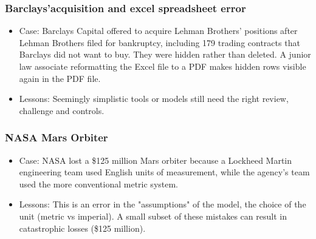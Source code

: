 \subsubsection{Barclays'acquisition and excel spreadsheet error}
\begin{itemize}
\item Case: Barclays Capital offered to acquire Lehman Brothers' positions after Lehman Brothers filed for bankruptcy, including 179 trading contracts that Barclays did not want to buy. They were hidden rather than deleted. A junior law associate reformatting the Excel file to a PDF makes hidden rows visible again in the PDF file.
\item Lessons: Seemingly simplistic tools or models still need the right review, challenge and controls.
\end{itemize}





\subsubsection{NASA Mars Orbiter}
\begin{itemize}
\item Case: NASA lost a \$125 million Mars orbiter because a Lockheed Martin engineering team used English units of measurement, while the agency's team used the more conventional metric system.
\item Lessons: This is an error in the "assumptions" of the model, the choice of the unit (metric vs imperial). A small subset of these mistakes can result in catastrophic losses (\$125 million).
\end{itemize}


